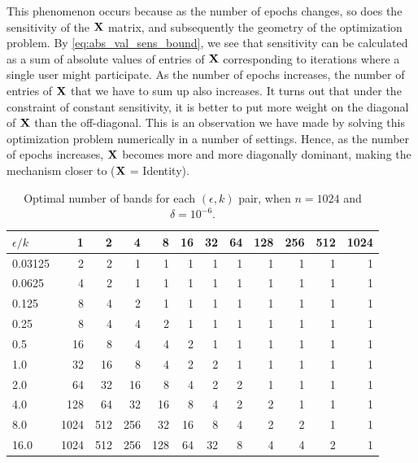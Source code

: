 \documentclass{article}
\begin{document}
This phenomenon occurs because as the number of epochs changes, so does the sensitivity of the $\mathbf{X}$ matrix, and subsequently the geometry of the optimization problem.  By \cref{eq:abs_val_sens_bound}, we see that sensitivity can be calculated as a sum of absolute values of entries of $\mathbf{X}$ corresponding to iterations where a single user might participate.  As the number of epochs increases, the number of entries of $\mathbf{X}$ that we have to sum up also increases.  It turns out that under the constraint of constant sensitivity, it is better to put more weight on the diagonal of $\mathbf{X}$ than the off-diagonal.  This is an observation we have made by solving this optimization problem numerically in a number of settings. Hence, as the number of epochs increases, $\mathbf{X}$ becomes more and more diagonally dominant, making the mechanism closer to \dpsgd ($\mathbf{X}$ = Identity).

\begin{table}[H]
\centering
\begin{tabular}{l|rrrrrrrrrrr}
\toprule
$\epsilon / k$ &  1    &  2    &  4    &  8    &  16   &  32   &  64   &  128  &  256  &  512  &  1024 \\
\midrule
0.03125  &     2 &     2 &     1 &     1 &     1 &     1 &     1 &     1 &     1 &     1 &     1 \\
0.0625  &     4 &     2 &     1 &     1 &     1 &     1 &     1 &     1 &     1 &     1 &     1 \\
0.125  &     8 &     4 &     2 &     1 &     1 &     1 &     1 &     1 &     1 &     1 &     1 \\
0.25  &     8 &     4 &     4 &     2 &     1 &     1 &     1 &     1 &     1 &     1 &     1 \\
0.5  &    16 &     8 &     4 &     4 &     2 &     1 &     1 &     1 &     1 &     1 &     1 \\
1.0  &    32 &    16 &     8 &     4 &     2 &     2 &     1 &     1 &     1 &     1 &     1 \\
2.0  &    64 &    32 &    16 &     8 &     4 &     2 &     2 &     1 &     1 &     1 &     1 \\
4.0  &   128 &    64 &    32 &    16 &     8 &     4 &     2 &     2 &     1 &     1 &     1 \\
8.0  &  1024 &   512 &   256 &    32 &    16 &     8 &     4 &     2 &     2 &     1 &     1 \\
16.0 &  1024 &   512 &   256 &   128 &    64 &    32 &     8 &     4 &     4 &     2 &     1 \\
\bottomrule
\end{tabular}
\caption{\label{table:optbands} Optimal number of bands for each $(\epsilon, k)$ pair, when $n=1024$ and $\delta = 10^{-6}$.}
\end{table}
\end{document}
